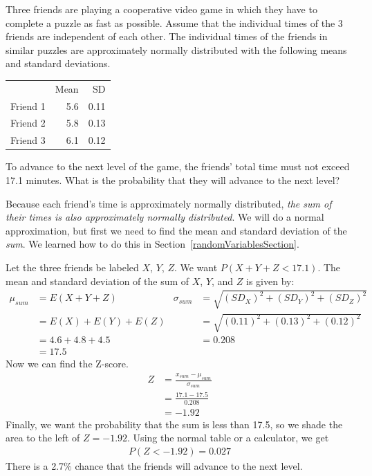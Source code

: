 \begin{example}{Three friends are playing a cooperative video game in which they have to complete a puzzle as fast as possible. Assume that the individual times of the 3 friends are independent of each other. The individual times of the friends in similar puzzles are approximately normally distributed with the following means and standard deviations. 
\begin{center}
\begin{tabular}{lrr}
& Mean &  SD \\
Friend 1 	& 5.6 & 0.11  \\
Friend 2 	& 5.8  & 0.13 \\
Friend 3 	& 6.1  & 0.12  
\end{tabular}
\end{center}
To advance to the next level of the game, the friends' total time must not exceed 17.1 minutes. What is the probability that they will advance to the next level?}
Because each friend's time is approximately normally distributed, \emph{the sum of their times is also approximately normally distributed}. We will do a normal approximation, but first we need to find the mean and standard deviation of the \emph{sum}. We learned how to do this in Section~\ref{randomVariablesSection}.

Let the three friends be labeled $X$, $Y$, $Z$. We want $P(X + Y + Z < 17.1)$. The mean and standard deviation of the sum of $X$, $Y$, and $Z$ is given by:
\begin{align*}
\mu_{sum} &= E(X+Y+Z)
	& \sigma_{sum}&= \sqrt{(SD_X)^2+(SD_Y)^2 + (SD_Z)^2} \\
&= E(X) + E(Y) + E(Z)
	& &= \sqrt{(0.11)^2+(0.13)^2+(0.12)^2}\\
&=4.6+4.8+4.5
	& &= 0.208 \\
&=17.5
\end{align*}
Now we can find the Z-score. 
\begin{align*}
Z &= \frac{x_{sum}-\mu_{sum}}{\sigma_{sum}} \\
&=\frac{17.1-17.5}{0.208} \\
&=-1.92
\end{align*}
Finally, we want the probability that the sum is less than 17.5, so we shade the area to the left of $Z = -1.92$. Using the normal table or a calculator, we get
\begin{align*}
P(Z < -1.92) = 0.027
\end{align*}
There is a 2.7\% chance that the friends will advance to the next level.
\end{example}

